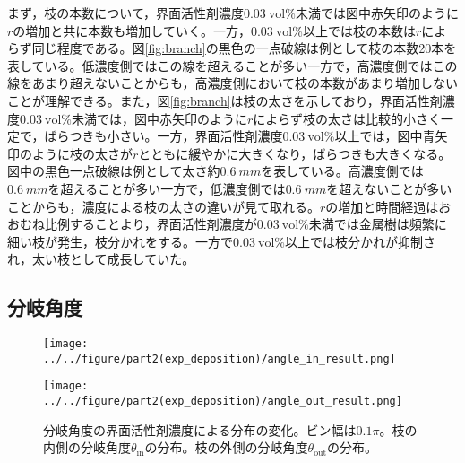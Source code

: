 \documentclass[autodetect-engine,dvi=dvipdfmx,a4paper,ja=standard,oneside,openany,11pt]{bxjsbook}
\begin{document}
まず，枝の本数について，界面活性剤濃度$\SI{0.03}{\mathrm{vol}\%}$未満では図中赤矢印のように$r$の増加と共に本数も増加していく。一方，$\SI{0.03}{\mathrm{vol}\%}$以上では枝の本数は$r$によらず同じ程度である。図\ref{fig:branch}の黒色の一点破線は例として枝の本数20本を表している。低濃度側ではこの線を超えることが多い一方で，高濃度側ではこの線をあまり超えないことからも，高濃度側において枝の本数があまり増加しないことが理解できる。また，図\ref{fig:branch}は枝の太さを示しており，界面活性剤濃度$\SI{0.03}{\mathrm{vol}\%}$未満では，図中赤矢印のように$r$によらず枝の太さは比較的小さく一定で，ばらつきも小さい。一方，界面活性剤濃度$\SI{0.03}{\mathrm{vol}\%}$以上では，図中青矢印のように枝の太さが$r$とともに緩やかに大きくなり，ばらつきも大きくなる。図中の黒色一点破線は例として太さ約$\SI{0.6}{mm}$を表している。高濃度側では$\SI{0.6}{mm}$を超えることが多い一方で，低濃度側では$\SI{0.6}{mm}$を超えないことが多いことからも，濃度による枝の太さの違いが見て取れる。$r$の増加と時間経過はおおむね比例することより，界面活性剤濃度が$\SI{0.03}{\mathrm{vol}\%}$未満では金属樹は頻繁に細い枝が発生，枝分かれをする。一方で$\SI{0.03}{\mathrm{vol}\%}$以上では枝分かれが抑制され，太い枝として成長していた。

\subsection{分岐角度}

\begin{figure}[htbp]
  \begin{minipage}
    {0.5\textwidth}
    \subcaption{}
    \centering
    \texttt{[image: ../../figure/part2(exp\_deposition)/angle\_in\_result.png]}
    \label{fig:angle_in}
  \end{minipage}
  \begin{minipage}
    {0.45\textwidth}
    \subcaption{}
    \centering
    \texttt{[image: ../../figure/part2(exp\_deposition)/angle\_out\_result.png]}
    \label{fig:angle_out}
  \end{minipage}
  \caption{分岐角度の界面活性剤濃度による分布の変化。ビン幅は$0.1\pi$。枝の内側の分岐角度$\theta_{\mathrm{in}}$の分布。枝の外側の分岐角度$\theta_{\mathrm{out}}$の分布。}
  \label{fig:angle}
\end{figure}
\end{document}
